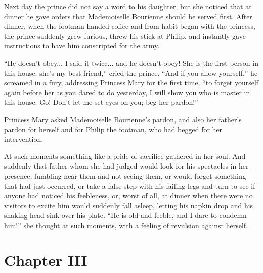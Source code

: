 Next day the prince did not say a word to his daughter, but she
noticed that at dinner he gave orders that Mademoiselle Bourienne
should be served first. After dinner, when the footman handed
coffee and from habit began with the princess, the prince
suddenly grew furious, threw his stick at Philip, and instantly
gave instructions to have him conscripted for the army.

``He doesn't obey... I said it twice... and he doesn't obey! She
is the first person in this house; she's my best friend,'' cried
the prince.  ``And if you allow yourself,'' he screamed in a
fury, addressing Princess Mary for the first time, ``to forget
yourself again before her as you dared to do yesterday, I will
show you who is master in this house. Go!  Don't let me set eyes
on you; beg her pardon!''

Princess Mary asked Mademoiselle Bourienne's pardon, and also her
father's pardon for herself and for Philip the footman, who had
begged for her intervention.

At such moments something like a pride of sacrifice gathered in
her soul. And suddenly that father whom she had judged would look
for his spectacles in her presence, fumbling near them and not
seeing them, or would forget something that had just occurred, or
take a false step with his failing legs and turn to see if anyone
had noticed his feebleness, or, worst of all, at dinner when
there were no visitors to excite him would suddenly fall asleep,
letting his napkin drop and his shaking head sink over his
plate. ``He is old and feeble, and I dare to condemn him!''  she
thought at such moments, with a feeling of revulsion against
herself.


\chapter*{Chapter III}
\ifaudio     
{} 
\fi

